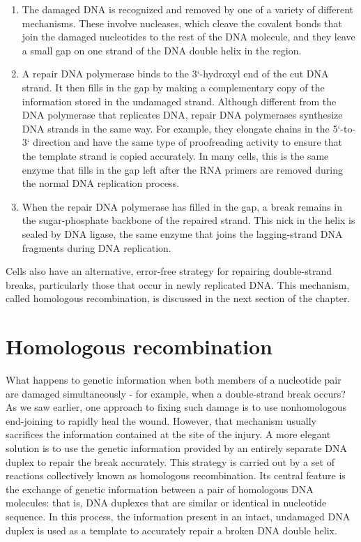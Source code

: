 \begin{enumerate}
\item The damaged DNA is recognized and removed by one of a variety
of different mechanisms. These involve nucleases, which cleave
the covalent bonds that join the damaged nucleotides to the rest of
the DNA molecule, and they leave a small gap on one strand of the
DNA double helix in the region.
\item A repair DNA polymerase binds to the 3`-hydroxyl end of the cut
DNA strand. It then fills in the gap by making a complementary
copy of the information stored in the undamaged strand. Although
different from the DNA polymerase that replicates DNA, repair
DNA polymerases synthesize DNA strands in the same way. For
example, they elongate chains in the 5`-to-3` direction and have
the same type of proofreading activity to ensure that the template
strand is copied accurately. In many cells, this is the same enzyme
that fills in the gap left after the RNA primers are removed during
the normal DNA replication process.
\item When the repair DNA polymerase has filled in the gap, a break
remains in the sugar-phosphate backbone of the repaired strand.
This nick in the helix is sealed by DNA ligase, the same enzyme that
joins the lagging-strand DNA fragments during DNA replication.
\end{enumerate}

Cells also have an alternative, error-free strategy for repairing double-strand
breaks, particularly those that occur in newly replicated DNA. This
mechanism, called homologous recombination, is discussed in the next
section of the chapter.

\section{Homologous recombination}

What happens to genetic information when both members of a
nucleotide pair are damaged simultaneously - for example, when a
double-strand break occurs? As we saw earlier, one approach to fixing
such damage is to use nonhomologous end-joining to rapidly heal the
wound. However, that mechanism usually sacrifices the information
contained at the site of the injury. A more elegant solution is to use the
genetic information provided by an entirely separate DNA duplex to repair
the break accurately. This strategy is carried out by a set of reactions
collectively known as homologous recombination. Its central feature
is the exchange of genetic information between a pair of homologous
DNA molecules: that is, DNA duplexes that are similar or identical
in nucleotide sequence. In this process, the information present in an
intact, undamaged DNA duplex is used as a template to accurately repair
a broken DNA double helix.

